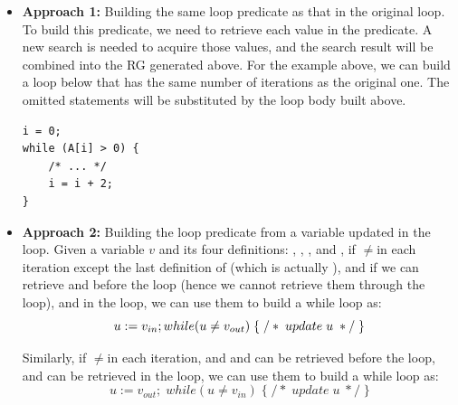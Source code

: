 
\begin{itemize}
\setlength{\itemsep}{5pt}%

\item \textbf{Approach 1:} Building the same loop predicate as that in the original loop. 
To build this predicate, we need to retrieve each value in the predicate.
A new search is needed to acquire those values, and the search result will be combined into the RG generated above.
For the example above, we can build a loop below that has the same number of iterations as the original one. The omitted statements will be substituted by the loop body built above.


\begin{lstlisting}
i = 0;
while (A[i] > 0) {
    /* ... */
    i = i + 2;
}
\end{lstlisting}





\item \textbf{Approach 2:} Building the loop predicate from a variable updated in the loop. Given a variable $v$ and its four definitions: \vinit, \vmu, \viter, and \vfinal, if \vmu$\ne$\vfinal in each iteration except the last definition of \vmu (which is actually \vfinal), and if we can retrieve \vinit and \vfinal before the loop (hence we cannot retrieve them through the loop), and \viter in the loop, we can use them to build a while loop as:
$$
u := v_{in}; \;\\
while (u \ne v_{out}) \;  \{\; 
/* \; update \; u \; */ \; 
\}
$$

Similarly, if \viter$\ne$\vinit  in each iteration, and  \vinit and \vfinal can be retrieved before the loop, and \vmu can be retrieved in the loop, we can use them to build a while loop as: 
$$
u := v_{out}; \; while (u \ne v_{in}) \;  \{\; /* \; update \; u \; */ \; \}
$$


\end{itemize}
